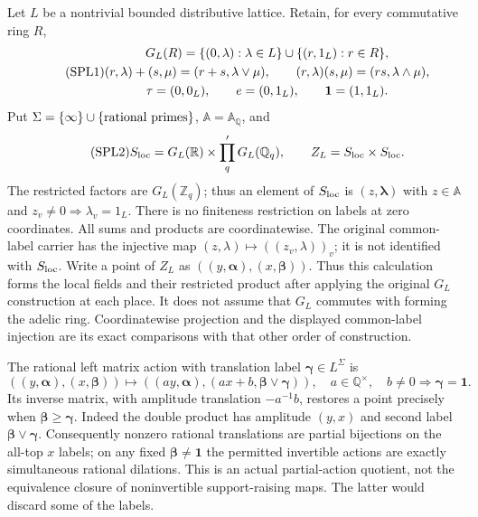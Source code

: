 Let $L$ be a nontrivial bounded distributive lattice. Retain, for every
commutative ring $R$,
\begin{equation}\tag{SPL1}
\begin{gathered}
G_L(R)=\{(0,\lambda):\lambda\in L\}\cup\{(r,1_L):r\in R\},\\
(r,\lambda)+(s,\mu)=(r+s,\lambda\vee\mu),\qquad
(r,\lambda)(s,\mu)=(rs,\lambda\wedge\mu),\\
\tau=(0,0_L),\qquad e=(0,1_L),\qquad {\bf1}=(1,1_L).
\end{gathered}
\end{equation}
Put $\Sigma=\{\infty\}\cup\{\hbox{rational primes}\}$,
$\mathbb A=\mathbb A_{\mathbb Q}$, and
\begin{equation}\tag{SPL2}
S_{\rm loc}=G_L(\mathbb R)\times\prod_q'G_L(\mathbb Q_q),
\qquad Z_L=S_{\rm loc}\times S_{\rm loc}.
\end{equation}
The restricted factors are $G_L(\mathbb Z_q)$; thus an element of $S_{\rm loc}$
is $(z,\boldsymbol\lambda)$ with $z\in\mathbb A$ and
$z_v\ne0\Rightarrow\lambda_v=1_L$. There is no finiteness restriction
on labels at zero coordinates. All sums and products are coordinatewise.
The original common-label carrier has the injective map
$(z,\lambda)\mapsto((z_v,\lambda))_v$; it is not identified with
$S_{\rm loc}$. Write a point of $Z_L$ as
$((y,\boldsymbol\alpha),(x,\boldsymbol\beta))$.
Thus this calculation forms the local fields and their restricted
product after applying the original $G_L$ construction at each place.
It does not assume that $G_L$ commutes with forming the adelic ring.
Coordinatewise projection and the displayed common-label injection
are its exact comparisons with that other order of construction.

The rational left matrix action with translation label
$\boldsymbol\gamma\in L^\Sigma$ is
\begin{equation}\tag{SPL3}
((y,\boldsymbol\alpha),(x,\boldsymbol\beta))
\longmapsto
((ay,\boldsymbol\alpha),(ax+b,\boldsymbol\beta\vee\boldsymbol\gamma)),
\quad a\in\mathbb Q^\times,\quad
b\ne0\Rightarrow\boldsymbol\gamma=\boldsymbol1.
\end{equation}
Its inverse matrix, with amplitude translation $-a^{-1}b$, restores a
point precisely when $\boldsymbol\beta\ge\boldsymbol\gamma$.
Indeed the double product has amplitude $(y,x)$ and second label
$\boldsymbol\beta\vee\boldsymbol\gamma$. Consequently nonzero
rational translations are partial bijections on the all-top $x$ labels;
on any fixed $\boldsymbol\beta\ne\boldsymbol1$ the permitted invertible
actions are exactly simultaneous rational dilations. This is an actual
partial-action quotient, not the equivalence closure of noninvertible
support-raising maps. The latter would discard some of the labels.

